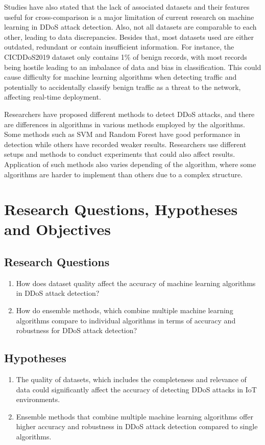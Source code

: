 \documentclass[a4paper, 12pt]{article}
\begin{document}
Studies have also stated that the lack of associated datasets and their features useful for cross-comparison is a major limitation of current research on machine learning in DDoS attack detection.  Also, not all datasets are comparable to each other, leading to data discrepancies. Besides that, most datasets used are either outdated, redundant or contain insufficient information. For instance, the CICDDoS2019 dataset only contains 1\% of benign records, with most records being hostile leading to an imbalance of data and bias in classification.  This could cause difficulty for machine learning algorithms when detecting traffic and potentially to accidentally classify benign traffic as a threat to the network, affecting real-time deployment. 

Researchers have proposed different methods to detect DDoS attacks, and there are differences in algorithms in various methods employed by the algorithms. Some methods such as SVM and Random Forest have good performance in detection while others have recorded weaker results. Researchers use different setups and methods to conduct experiments that could also affect results.  Application of such methods also varies depending of the algorithm, where some algorithms are harder to implement than others due to a complex structure. \cite{9} 

\clearpage

\section{Research Questions, Hypotheses and Objectives}

\subsection{Research Questions}
\begin{enumerate}
  \item How does dataset quality affect the accuracy of machine learning algorithms in DDoS attack detection?
  \item How do ensemble methods, which combine multiple machine learning algorithms compare to individual algorithms in terms of accuracy and robustness for DDoS attack detection? 
\end{enumerate}

\subsection{Hypotheses}
\begin{enumerate}
  \item The quality of datasets, which includes the completeness and relevance of data could significantly affect the accuracy of detecting DDoS attacks in IoT environments.
  \item Ensemble methods that combine multiple machine learning algorithms offer higher accuracy and robustness in DDoS attack detection compared to single algorithms.
\end{enumerate}
\end{document}
